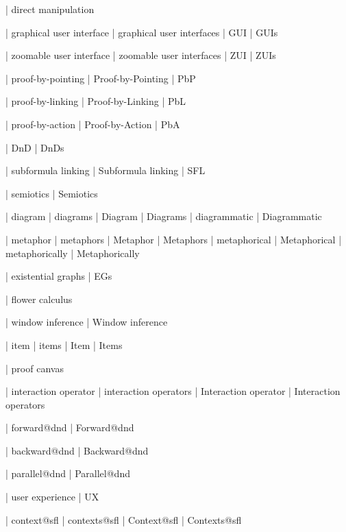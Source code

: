  | direct manipulation

 | graphical user interface
 | graphical user interfaces
 | GUI
 | GUIs

 | zoomable user interface
 | zoomable user interfaces
 | ZUI
 | ZUIs

 | proof-by-pointing
 | Proof-by-Pointing
 | PbP

 | proof-by-linking
 | Proof-by-Linking
 | PbL

 | proof-by-action
 | Proof-by-Action
 | PbA

 | DnD
 | DnDs

 | subformula linking
 | Subformula linking
 | SFL

 | semiotics
 | Semiotics

 | diagram
 | diagrams
 | Diagram
 | Diagrams
 | diagrammatic
 | Diagrammatic

 | metaphor
 | metaphors
 | Metaphor
 | Metaphors
 | metaphorical
 | Metaphorical
 | metaphorically
 | Metaphorically

 | existential graphs
 | EGs

 | flower calculus
 
 | window inference
 | Window inference


 | item
 | items
 | Item
 | Items

 | proof canvas

 | interaction operator
 | interaction operators
 | Interaction operator
 | Interaction operators

 | forward@dnd
 | Forward@dnd

 | backward@dnd
 | Backward@dnd

 | parallel@dnd
 | Parallel@dnd


 | user experience
 | UX
 
 | context@sfl
 | contexts@sfl
 | Context@sfl
 | Contexts@sfl

